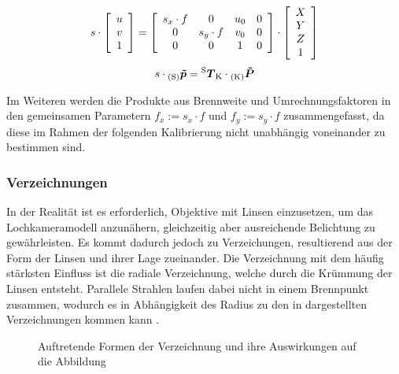 

\begin{equation}
s \cdot 
\mat{c}{
u\\
v\\
1
}
= 
\mat{cccc}{
s_x \cdot f & 0 & u_\ind{0} & 0\\
0 & s_y \cdot f & v_\ind{0} & 0\\
0 & 0 & 1 & 0
}
 \cdot
\mat{c}{
X\\
Y\\
Z\\
1
}
\label{eq.intrinsic}
\end{equation}
\begin{equation}
s \cdot {_{{\mathrm{(S)}}}}\mbox{\boldmath{$\tilde{p}$}} = {^{\mathrm{S}}\mbox{\boldmath{$T$}}_{\mathrm{K}}} \cdot {_{{\mathrm{(K)}}}}\mbox{\boldmath{$\tilde{P}$}}
\end{equation}

Im Weiteren werden die Produkte aus Brennweite und Umrechnungsfaktoren in den gemeinsamen Parametern $f_x := s_x \cdot f$ und $f_y := s_y \cdot f$ zusammengefasst, da diese im Rahmen der folgenden Kalibrierung nicht unabhängig voneinander zu bestimmen sind.

\subsubsection{Verzeichnungen}
In der Realität ist es erforderlich, Objektive mit Linsen einzusetzen, um das Lochkameramodell anzunähern, gleichzeitig aber ausreichende Belichtung zu gewährleisten. Es kommt dadurch jedoch zu Verzeichungen, resultierend aus der Form der Linsen und ihrer Lage zueinander. Die Verzeichnung mit dem häufig stärksten Einfluss ist die radiale Verzeichnung, welche durch die Krümmung der Linsen entsteht. Parallele Strahlen laufen dabei nicht in einem Brennpunkt zusammen, wodurch es in Abhängigkeit des Radius zu den in  dargestellten Verzeichnungen kommen kann \cite{Hertzberg2012}.

\begin{figure}[!ht]
	\begin{center}
	\hspace{4mm}
	\hspace{4mm}
	\caption{Auftretende Formen der Verzeichnung und ihre Auswirkungen auf die Abbildung}
	\label{fig.distortions}
	\end{center}
\end{figure}

